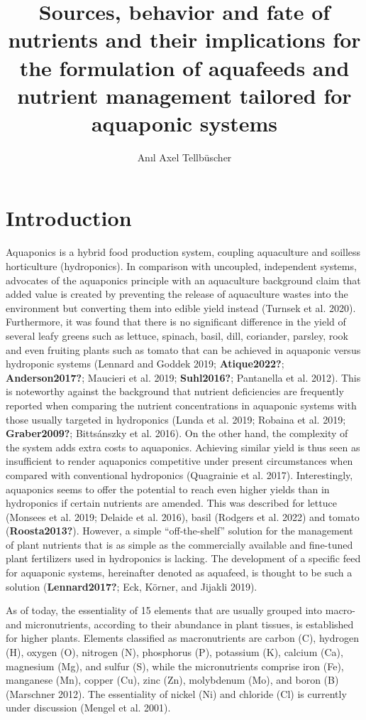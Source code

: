 \documentclass[
]{article}
\title{Sources, behavior and fate of nutrients and their implications for the formulation of aquafeeds and nutrient management tailored for aquaponic systems}
\author{Anıl Axel Tellbüscher}
\date{}
\begin{document}
\maketitle

{
\setcounter{tocdepth}{2}
\tableofcontents
}
\hypertarget{introduction}{%
\section{Introduction}\label{introduction}}

Aquaponics is a hybrid food production system, coupling aquaculture and soilless horticulture (hydroponics). In comparison with uncoupled, independent systems, advocates of the aquaponics principle with an aquaculture background claim that added value is created by preventing the release of aquaculture wastes into the environment but converting them into edible yield instead (Turnsek et al. 2020). Furthermore, it was found that there is no significant difference in the yield of several leafy greens such as lettuce, spinach, basil, dill, coriander, parsley, rook and even fruiting plants such as tomato that can be achieved in aquaponic versus hydroponic systems (Lennard and Goddek 2019; \textbf{Atique2022?}; \textbf{Anderson2017?}; Maucieri et al. 2019; \textbf{Suhl2016?}; Pantanella et al. 2012). This is noteworthy against the background that nutrient deficiencies are frequently reported when comparing the nutrient concentrations in aquaponic systems with those usually targeted in hydroponics (Lunda et al. 2019; Robaina et al. 2019; \textbf{Graber2009?}; Bittsánszky et al. 2016). On the other hand, the complexity of the system adds extra costs to aquaponics. Achieving similar yield is thus seen as insufficient to render aquaponics competitive under present circumstances when compared with conventional hydroponics (Quagrainie et al. 2017). Interestingly, aquaponics seems to offer the potential to reach even higher yields than in hydroponics if certain nutrients are amended. This was described for lettuce (Monsees et al. 2019; Delaide et al. 2016), basil (Rodgers et al. 2022) and tomato (\textbf{Roosta2013?}). However, a simple ``off-the-shelf'' solution for the management of plant nutrients that is as simple as the commercially available and fine-tuned plant fertilizers used in hydroponics is lacking. The development of a specific feed for aquaponic systems, hereinafter denoted as aquafeed, is thought to be such a solution (\textbf{Lennard2017?}; Eck, Körner, and Jijakli 2019).

As of today, the essentiality of 15 elements that are usually grouped into macro- and micronutrients, according to their abundance in plant tissues, is established for higher plants. Elements classified as macronutrients are carbon (C), hydrogen (H), oxygen (O), nitrogen (N), phosphorus (P), potassium (K), calcium (Ca), magnesium (Mg), and sulfur (S), while the micronutrients comprise iron (Fe), manganese (Mn), copper (Cu), zinc (Zn), molybdenum (Mo), and boron (B) (Marschner 2012). The essentiality of nickel (Ni) and chloride (Cl) is currently under discussion (Mengel et al. 2001).
\end{document}
